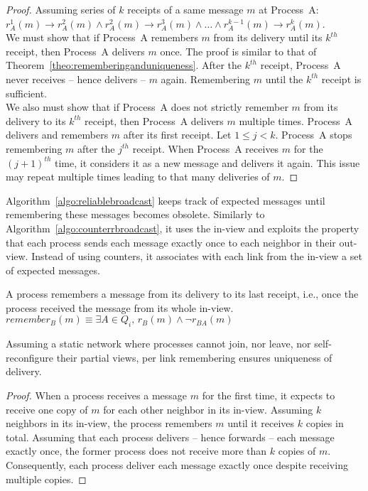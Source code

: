 \begin{proof}
  Assuming series of $k$ receipts of a same message $m$ at Process~A:
  $r^1_A(m) \rightarrow r^2_A(m) \wedge r^2_A(m) \rightarrow r^3_A(m) \wedge \ldots \wedge
  r^{k-1}_A(m) \rightarrow r^k_A(m)$. \\
  We must show that if Process~A remembers $m$ from its delivery until its
  $k^{th}$ receipt, then Process~A delivers $m$ once. The proof is similar to
  that of Theorem~\ref{theo:rememberinganduniqueness}. After the $k^{th}$
  receipt, Process~A never receives -- hence delivers -- $m$ again. Remembering
  $m$ until the $k^{th}$ receipt is sufficient.\\
  We also must show that if Process~A does not strictly remember $m$ from its
  delivery to its $k^{th}$ receipt, then Process~A delivers $m$ multiple
  times. Process~A delivers and remembers $m$ after its first receipt. Let
  $1\leq j<k$. Process~A stops remembering $m$ after the $j^{th}$ receipt. When
  Process~A receives $m$ for the $(j+1)^{th}$ time, it considers it as a new
  message and delivers it again. This issue may repeat multiple times leading to
  that many deliveries of $m$.
\end{proof}

Algorithm~\ref{algo:reliablebroadcast} keeps track of expected messages until
remembering these messages becomes obsolete.  Similarly to
Algorithm~\ref{algo:counterrbroadcast}, it uses the in-view and exploits the
property that each process sends each message exactly once to each neighbor in
their out-view.  Instead of using counters, it associates with each link from
the in-view a set of expected messages.

\begin{definition}
  A process remembers a message from its delivery to its last receipt, i.e.,
  once the process received the message from its whole in-view.
  $remember_B(m) \equiv \exists A \in Q_i,\, r_B(m) \wedge \neg r_{BA}(m)$
\end{definition}

\begin{lemma}
  Assuming a static network where processes cannot join, nor leave, nor
  self-reconfigure their partial views, per link remembering ensures uniqueness
  of delivery.
\end{lemma}

\begin{proof}
  When a process receives a message $m$ for the first time, it expects to
  receive one copy of $m$ for each other neighbor in its in-view. Assuming $k$
  neighbors in its in-view, the process remembers $m$ until it receives $k$
  copies in total. Assuming that each process delivers -- hence forwards -- each
  message exactly once, the former process does not receive more than $k$ copies
  of $m$. Consequently, each process deliver each message exactly once despite
  receiving multiple copies.
\end{proof}

